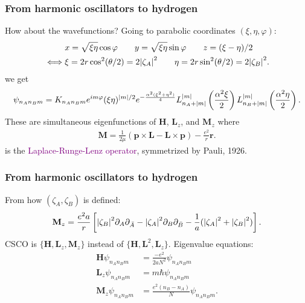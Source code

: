 \documentclass{beamer}
\theoremstyle{definition}
\newcommand{\lp}{\left(}
\newcommand{\rp}{\right)}
\newcommand{\lb}{\left[}
\newcommand{\rb}{\right]}
\newcommand{\p}{\partial}
\newcommand{\f}[2]{\frac{#1}{#2}}
\newcommand{\al}{\alpha}
\begin{document}
\begin{frame}
\frametitle{From harmonic oscillators to hydrogen}
How about the wavefunctions? Going to parabolic coordinates $(\xi, \eta, \varphi)$:
\begin{align*}
&x = \sqrt{\xi\eta}\cos\varphi \quad\quad y = \sqrt{\xi\eta}\sin\varphi \quad\quad z = (\xi - \eta)/2\\
\iff 
&\xi = 2r\cos^2 (\theta/2) = 2\abs{\zeta_A}^2  \quad\quad \eta = 2r\sin^2 (\theta/2) = 2\abs{\zeta_B}^2. 
\end{align*}
we get
\begin{align*}
\psi_{n_A n_B m} = K_{n_An_B m} e^{im\varphi} (\xi \eta)^{\abs{m}/2}  e^{ -\f{\al^2(\xi^2 + \eta^2)}{4}}
L_{n_A + \abs{m}}^{\abs{m}} \lp\f{\al^2 \xi}{2} \rp
L_{n_B + \abs{m}}^{\abs{m}} \lp\f{\al^2 \eta}{2} \rp.
\end{align*}
These are simultaneous eigenfunctions of $\mathbf{H}$, $\mathbf{L}_z$, and $\mathbf{M}_z$ where
\begin{align*}
\mathbf{M} = \f{1}{2\mu} (\mathbf{p}\times \mathbf{L} - \mathbf{L}\times \mathbf{p}) - \f{e^2}{r} \mathbf{r}.
\end{align*}
is the \textcolor{purple}{Laplace-Runge-Lenz operator}, symmetrized by Pauli, 1926.

\end{frame}




\begin{frame}
\frametitle{From harmonic oscillators to hydrogen}
From how $(\zeta_A, \zeta_B)$ is defined:
\begin{align*}
\mathbf{M}_z = \f{e^2a}{r} 
\lb  
\abs{\zeta_B}^2 \p_A \p_{\bar{A}}  
- \abs{\zeta_A}^2 \p_B \p_{\bar{B}} 
-  \f{1}{a} ( \abs{\zeta_A}^2 + \abs{\zeta_B}^2) 
\rb.
\end{align*}
CSCO is $\{ \mathbf{H}, \mathbf{L}_z, \mathbf{M}_z \}$ instead of $\{ \mathbf{H}, \mathbf{L}^2 , \mathbf{L}_z \}$. Eigenvalue equations:
\begin{align*}
\mathbf{H} \psi_{n_A n_B m} &= \f{-e^2}{2aN^2} \psi_{n_A n_B m} \\
\mathbf{L}_z \psi_{n_A n_B m} &= m \hbar \psi_{n_A n_B m}\\
\mathbf{M}_z \psi_{n_A n_B m} &= \f{e^2 (n_B - n_A)}{N}  \psi_{n_A n_B m}.
\end{align*}


\end{frame}
\end{document}
